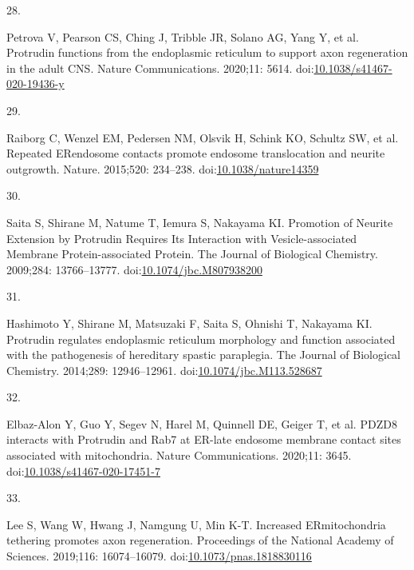 \documentclass[
  12pt,
  a4paper,
]{book}
\newlength{\cslhangindent}
\newlength{\csllabelwidth}
\newlength{\cslentryspacingunit} %
\newenvironment{CSLReferences}[2] %
 {%
  \setlength{\parindent}{0pt}
  \ifodd #1
  \let\oldpar\par
  \def\par{\hangindent=\cslhangindent\oldpar}
  \fi
  \setlength{\parskip}{#2\cslentryspacingunit}
 }%
 {}
\newcommand{\CSLLeftMargin}[1]{\parbox[t]{\csllabelwidth}{#1}}
\newcommand{\CSLRightInline}[1]{\parbox[t]{\linewidth - \csllabelwidth}{#1}\break}
\begin{document}
\begin{CSLReferences}{0}{0}
\leavevmode{}%
\CSLLeftMargin{28. }%
\CSLRightInline{Petrova V, Pearson CS, Ching J, Tribble JR, Solano AG, Yang Y, et al. Protrudin functions from the endoplasmic reticulum to support axon regeneration in the adult {CNS}. Nature Communications. 2020;11: 5614. doi:\href{https://doi.org/10.1038/s41467-020-19436-y}{10.1038/s41467-020-19436-y}}

\leavevmode{}%
\CSLLeftMargin{29. }%
\CSLRightInline{Raiborg C, Wenzel EM, Pedersen NM, Olsvik H, Schink KO, Schultz SW, et al. Repeated {ER}\textendash endosome contacts promote endosome translocation and neurite outgrowth. Nature. 2015;520: 234--238. doi:\href{https://doi.org/10.1038/nature14359}{10.1038/nature14359}}

\leavevmode{}%
\CSLLeftMargin{30. }%
\CSLRightInline{Saita S, Shirane M, Natume T, Iemura S, Nakayama KI. Promotion of {Neurite Extension} by {Protrudin Requires Its Interaction} with {Vesicle-associated Membrane Protein-associated Protein}. The Journal of Biological Chemistry. 2009;284: 13766--13777. doi:\href{https://doi.org/10.1074/jbc.M807938200}{10.1074/jbc.M807938200}}

\leavevmode{}%
\CSLLeftMargin{31. }%
\CSLRightInline{Hashimoto Y, Shirane M, Matsuzaki F, Saita S, Ohnishi T, Nakayama KI. Protrudin regulates endoplasmic reticulum morphology and function associated with the pathogenesis of hereditary spastic paraplegia. The Journal of Biological Chemistry. 2014;289: 12946--12961. doi:\href{https://doi.org/10.1074/jbc.M113.528687}{10.1074/jbc.M113.528687}}

\leavevmode{}%
\CSLLeftMargin{32. }%
\CSLRightInline{Elbaz-Alon Y, Guo Y, Segev N, Harel M, Quinnell DE, Geiger T, et al. {PDZD8} interacts with {Protrudin} and {Rab7} at {ER-late} endosome membrane contact sites associated with mitochondria. Nature Communications. 2020;11: 3645. doi:\href{https://doi.org/10.1038/s41467-020-17451-7}{10.1038/s41467-020-17451-7}}

\leavevmode{}%
\CSLLeftMargin{33. }%
\CSLRightInline{Lee S, Wang W, Hwang J, Namgung U, Min K-T. Increased {ER}\textendash mitochondria tethering promotes axon regeneration. Proceedings of the National Academy of Sciences. 2019;116: 16074--16079. doi:\href{https://doi.org/10.1073/pnas.1818830116}{10.1073/pnas.1818830116}}


\end{CSLReferences}
\end{document}
